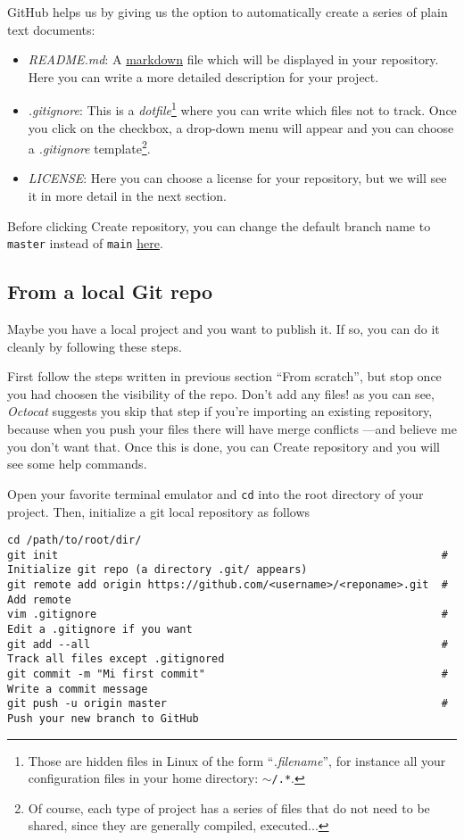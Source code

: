 \textsf{GitHub} helps us by giving us the option to automatically create a series of plain text documents:
\begin{itemize}
    \item \textit{README.md}: A \href{https://www.markdownguide.org/getting-started/}{markdown} file which will be displayed in your repository. Here you can write a more detailed description for your project.
    \item \textit{.gitignore}: This is a \textit{dotfile}\footnote{Those are hidden files in \textsf{Linux} of the form ``\textit{.filename}'', for instance all your configuration files in your home directory: \texttt{$\sim$/.*}.} where you can write which files not to track. Once you click on the checkbox, a drop-down menu will appear and you can choose a \textit{.gitignore} template\footnote{Of course, each type of project has a series of files that do not need to be shared, since they are generally compiled, executed...}.
    \item \textit{LICENSE}: Here you can choose a license for your repository, but we will see it in more detail in the next section.
\end{itemize}

Before clicking \textsf{Create repository}, you can change the default branch name to \texttt{master} instead of \texttt{main} \href{https://github.com/settings/repositories}{here}.

\subsection{From a local \textsf{Git} repo}

Maybe you have a local project and you want to publish it. If so, you can do it cleanly by following these steps.

First follow the steps written in previous section ``From scratch'', but stop once you had choosen the visibility of the repo. Don't add any files! as you can see, \textit{Octocat} suggests you skip that step if you're importing an existing repository, because when you push your files there will have merge conflicts ---and believe me you don't want that. Once this is done, you can \textsf{Create repository} and you will see some help commands.

Open your favorite terminal emulator and \texttt{cd} into the root directory of your project. Then, initialize a git local repository as follows

\begin{lstlisting}[style=shell]
cd /path/to/root/dir/
git init                                                            # Initialize git repo (a directory .git/ appears)
git remote add origin https://github.com/<username>/<reponame>.git  # Add remote
vim .gitignore                                                      # Edit a .gitignore if you want
git add --all                                                       # Track all files except .gitignored
git commit -m "Mi first commit"                                     # Write a commit message 
git push -u origin master                                           # Push your new branch to GitHub
\end{lstlisting}

